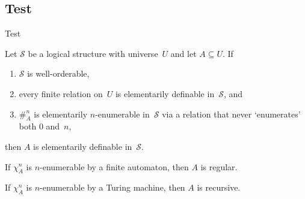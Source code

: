 \documentclass[hyperref={bookmarks=false}]{beamer}
\begin{document}
\subsection{Test}
\begin{frame}{Test}

  \begin{theorem}
    Let $\mathcal S$ be a logical structure with universe~$U$ and let
    $A \subseteq U$. If

    \begin{enumerate}
    \item
      $\mathcal S$ is well-orderable,
    \item
      every finite relation on~$U$ is elementarily definable
      in~$\mathcal S$, and
    \item
      \alert{$\#_{\!A}^n$} is elementarily \alert{$n$}-enumerable in~$\mathcal S$ via a
      relation that \alert{never `enumerates' both $0$ and~$n$},
    \end{enumerate}

    then \alert{$A$ is elementarily definable} in~$\mathcal S$.
  \end{theorem}
    \begin{overprint}
      \begin{corollary}
        If $\chi_A^n$ is $n$-enumerable by a finite automaton, then
        $A$ is regular.
      \end{corollary}

      \begin{corollary}
        If $\chi_A^n$ is $n$-enumerable by a Turing machine, then $A$
        is recursive.
      \end{corollary}
  \end{overprint}
\end{frame}
\end{document}
